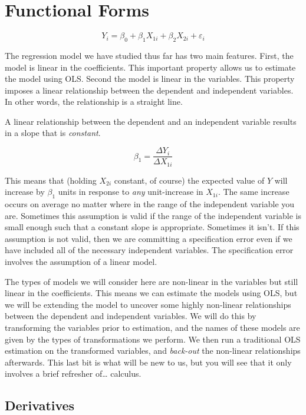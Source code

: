 \documentclass[
]{book}
\begin{document}
\chapter{Functional Forms}\label{FF}

\[Y_i = \beta_0 + \beta_1 X_{1i} + \beta_2 X_{2i} + \varepsilon_i\]

The regression model we have studied thus far has two main features. First, the model is linear in the coefficients. This important property allows us to estimate the model using OLS. Second the model is linear in the variables. This property imposes a linear relationship between the dependent and independent variables. In other words, the relationship is a straight line.

A linear relationship between the dependent and an independent variable results in a slope that is \emph{constant}.

\[\beta_1 = \frac{\Delta Y_i}{\Delta X_{1i}}\]

This means that (holding \(X_{2i}\) constant, of course) the expected value of \(Y\) will increase by \(\beta_1\) units in response to \emph{any} unit-increase in \(X_{1i}\). The same increase occurs on average no matter where in the range of the independent variable you are. Sometimes this assumption is valid if the range of the independent variable is small enough such that a constant slope is appropriate. Sometimes it isn't. If this assumption is not valid, then we are committing a specification error even if we have included all of the necessary independent variables. The specification error involves the assumption of a linear model.

The types of models we will consider here are non-linear in the variables but still linear in the coefficients. This means we can estimate the models using OLS, but we will be extending the model to uncover some highly non-linear relationships between the dependent and independent variables. We will do this by transforming the variables prior to estimation, and the names of these models are given by the types of transformations we perform. We then run a traditional OLS estimation on the transformed variables, and \emph{back-out} the non-linear relationships afterwards. This last bit is what will be new to us, but you will see that it only involves a brief refresher of\ldots{} calculus.

\section{Derivatives}\label{derivatives}
\end{document}
